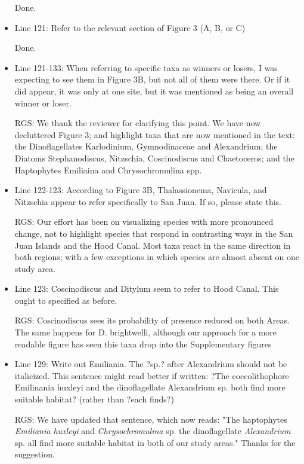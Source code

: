 \documentclass[11pt]{article}
\begin{document}
\begin{linenumbers}
\begin{itemize}
Done.

\item{Line 121: Refer to the relevant section of Figure 3 (A, B, or C)}

Done.

\item{Line 121-133: When referring to specific taxa as winners or losers, I was expecting to see them in Figure 3B, but not all of them were there. Or if it did appear, it was only at one site, but it was mentioned as being an overall winner or loser.}

{\color{red} RGS: We thank the reviewer for clarifying this point. We have now decluttered Figure 3; and highlight taxa that are now mentioned in the text: the Dinoflagellates Karlodinium, Gymnodinaceae and Alexandrium; the Diatoms Stephanodiscus, Nitzschia, Coscinodiscus and Chaetoceros; and the Haptophytes Emiliaina and Chrysochromulina spp.}

\item{Line 122-123: According to Figure 3B, Thalassionema, Navicula, and Nitzschia appear to refer specifically to San Juan. If so, please state this.}

{\color{red} RGS: Our effort has been on visualizing species with more pronounced change, not to highlight species that respond in contrasting ways in the San Juan Islands and the Hood Canal. Most taxa react in the same direction in both regions; with a few exceptions in which species are almost absent on one study area. }


\item{Line 123: Coscinodiscus and Ditylum seem to refer to Hood Canal. This ought to specified as before.}

{\color{red} RGS: Coscinodiscus sees its probability of presence reduced on both Areas. The same happens for D. brightwelli, although our approach for a more readable figure has seen this taxa drop into the Supplementary figures}


\item{Line 129: Write out Emiliania. The ?sp.? after Alexandrium should not be italicized. This sentence might read better if written: ?The coccolithophore Emilinania huxleyi and the dinoflagellate Alexandrium sp. both find more suitable habitat? (rather than ?each finds?)}

{\color{red} RGS: We have updated that sentence, which now reads: "The haptophytes \textit{Emiliania huxleyi} and \textit{Chrysochromulina} sp. the dinoflagellate \textit{Alexandrium} sp. all find more suitable habitat in both of our study areas." Thanks for the suggestion.  }



\end{itemize}
\end{linenumbers}
\end{document}
